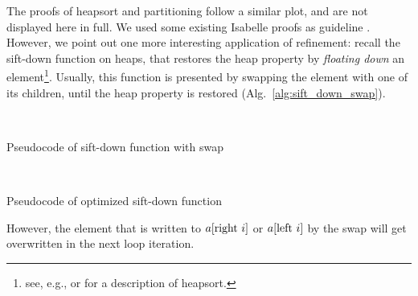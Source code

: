 \documentclass[sigplan,10pt,anonymous,review]{acmart}\settopmatter{printfolios=true,printccs=false,printacmref=false}
\theoremstyle{definition}
\begin{document}
  The proofs of heapsort and partitioning follow a similar plot, and are not displayed here in full.
  We used some existing Isabelle proofs as guideline \cite{LaWi19-IMP2,Gri19-AFP,La16}.
  However, we point out one more interesting application of refinement: recall the sift-down function on heaps,
  that restores the heap property by \emph{floating down} an element\footnote{see, e.g., \cite[Ch.~6]{CLRS09} or \cite[Ch.~2.4]{SeWa11} for a description of heapsort.}. Usually, this function is presented by swapping the element with one of its children, until the heap property is restored (Alg.~\ref{alg:sift_down_swap}).
  \begin{algorithm}
    \begin{algorithmic}
          \Else~\Return{}
          \EndIf
        \Else~\Return{}
        \EndIf
      \EndWhile
      \EndIf
    \EndProcedure
    \end{algorithmic}
  \caption{Pseudocode of sift-down function with swap}\label{alg:sift_down_swap}
  \end{algorithm}
  \begin{algorithm}
    \begin{algorithmic}
          \Else~\Return{}
          \EndIf
        \Else~\Return{}
        \EndIf
      \EndWhile
      \EndIf
    \EndProcedure
    \end{algorithmic}
  \caption{Pseudocode of optimized sift-down function}\label{alg:sift_down_opt}
  \end{algorithm}
  However, the element that is written to $a[\textrm{right}~i]$ or $a[\textrm{left}~i]$ by the swap will get overwritten in the next loop iteration.
\end{document}
